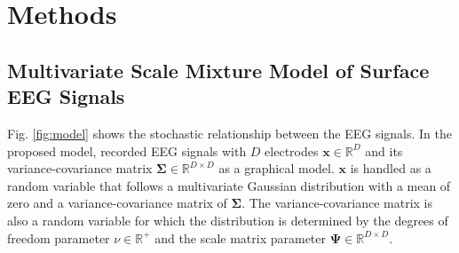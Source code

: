 \documentclass[journal]{IEEEtran}
\begin{document}
\section{Methods}

\subsection{Multivariate Scale Mixture Model of Surface EEG Signals}
Fig. \ref{fig:model} shows the stochastic relationship between the EEG signals.
In the proposed model, recorded EEG signals with $D$ electrodes $\mathbf{x} \in \mathbb{R}^{D}$ and its variance-covariance matrix $\mathbf{\Sigma} \in \mathbb{R}^{D \times D}$ as a graphical model.
$\mathbf{x}$ is handled as a random variable that follows a multivariate Gaussian distribution with a mean of zero and a variance-covariance matrix of $\mathbf{\Sigma}$.
The variance-covariance matrix  is also a random variable for which the distribution is determined by the degrees of freedom parameter $\nu \in \mathbb{R}^+$ and the scale matrix parameter $\mathbf{\Psi} \in \mathbb{R}^{D \times D}$.

\end{document}
